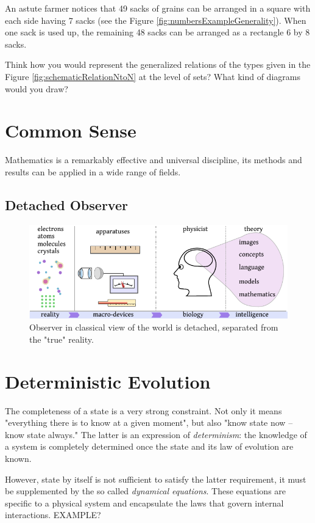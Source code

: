 An astute farmer notices that 49 sacks of grains can be arranged
in a square with each side having 7 sacks (see the Figure
\ref{fig:numbersExampleGenerality}). When one sack is used up, the
remaining 48 sacks can be arranged as a rectangle 6 by 8 sacks.


\begin{exercise}\label{exe:relationsGeneral}
Think how you would represent the generalized relations of the types
given in the Figure \ref{fig:schematicRelationNtoN} at the level of
sets? What kind of diagrams would you draw?
\end{exercise}

\section{Common Sense}
Mathematics is a remarkably effective and universal discipline, its
methods and
results can be applied in a wide range of fields.
\subsection{Detached Observer}
\begin{figure}[htbp]
	\centering
	\includegraphics[scale=1.0]{commonSensePerception}
	\caption{Observer in classical view of the world is detached, separated from the "true" reality.}
	\label{fig:commonSensePerception}
\end{figure}


\section{Deterministic Evolution}
The completeness of a state is a very strong constraint. Not only it means "everything there is to know at a given moment", but also "know state now -- know state always." The latter is an expression of \emph{determinism}: the knowledge of a system is completely determined once the state and its law of evolution are known.

  However, state by itself  is not sufficient to satisfy the latter requirement, it must be supplemented by the so called \emph{dynamical equations}. These equations are specific to a physical system and encapsulate the laws that govern internal interactions. EXAMPLE?

